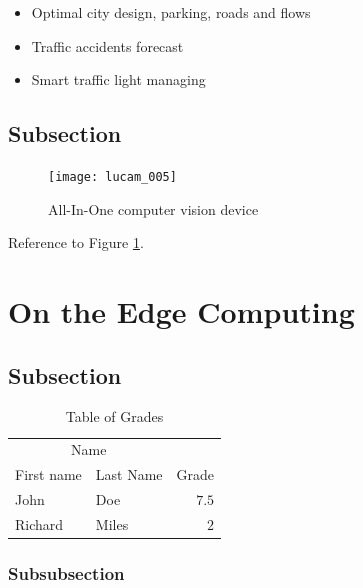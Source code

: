 \documentclass[fleqn,12pt]{SelfArx} %
\begin{document}
\begin{itemize}[noitemsep] %
\item Optimal city design, parking, roads and flows
\item Traffic accidents forecast
\item Smart traffic light managing
\end{itemize}

\subsection{Subsection}

\lipsum[9] %

\begin{figure}[ht]\centering
\texttt{[image: lucam\_005]}
\caption{All-In-One computer vision device}
\label{fig:results}
\end{figure}

Reference to Figure \ref{fig:results}.


\section{On the Edge Computing}

\lipsum[10] %

\subsection{Subsection}

\lipsum[11] %

\begin{table}[hbt]
\caption{Table of Grades}
\centering
\begin{tabular}{llr}
\toprule
\multicolumn{2}{c}{Name} \\
\cmidrule(r){1-2}
First name & Last Name & Grade \\
\midrule
John & Doe & $7.5$ \\
Richard & Miles & $2$ \\
\bottomrule
\end{tabular}
\label{tab:label}
\end{table}

\subsubsection{Subsubsection}
\end{document}

